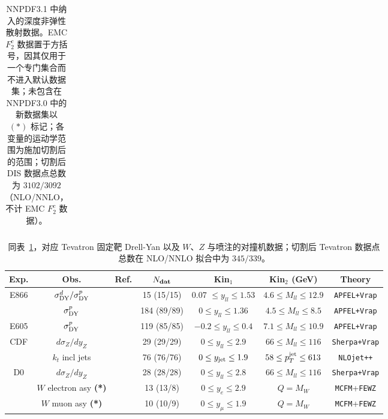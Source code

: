 \begin{table}
\begin{centering}
\begin{tabular}{|c|c|c|c|c|c|c|}
 \tabularnewline
  \hline
\end{tabular}
\par\end{centering}
\caption{\small NNPDF3.1 中纳入的深度非弹性散射数据。EMC $F_2^c$ 数据置于方括号，因其仅用于一个专门集合而不进入默认数据集；未包含在 NNPDF3.0 中的新数据集以 $(*)$ 标记；各变量的运动学范围为施加切割后的范围；切割后 DIS 数据点总数为 $3102/3092$（NLO/NNLO，不计 EMC $F_2^c$ 数据）。
\label{tab:completedataset}}
\end{table}\begin{table}
\footnotesize
\begin{centering}
    \renewcommand{\arraystretch}{1.4}
\begin{tabular}{|c|c|c|c|c|c|c|}
\hline
{Exp.} & Obs. & {Ref.}  & $ N_{\rm \bf dat}$ & Kin$_1$  & Kin$_2$ (GeV) & Theory \tabularnewline
\hline
\hline
\multirow{2}{*}{E866} &   $\sigma_{\rm DY}^d/\sigma_{\rm DY}^p$ & \cite{Towell:2001nh} & 15 (15/15)
& 0.07 $\le y_{ll}\le 1.53$ &
$ 4.6 \le M_{ll}\le 12.9 $  & {\tt APFEL+Vrap}\tabularnewline
&  $\sigma_{\rm DY}^p$ & \cite{Webb:2003ps,Webb:2003bj} & 184 (89/89) & $0 \le y_{ll}\le 1.36 $ &
$  4.5 \le M_{ll}\le 8.5 $  &{\tt APFEL+Vrap} \tabularnewline
 \hline
 E605 & $\sigma_{\rm DY}^p$ &  \cite{Moreno:1990sf} & 119 (85/85) & $ -0.2 \le y_{ll}\le 0.4$ &
 $ 7.1 \le M_{ll}\le 10.9 $  & {\tt APFEL+Vrap} \tabularnewline
 \hline
\multirow{2}{*}{CDF} &   $d\sigma_Z/dy_Z$ & \cite{Aaltonen:2010zza}&  29 (29/29)  & $ 0 \le y_{ll}\le 2.9 $  & $66 \le M_{ll}\le 116$   &{\tt Sherpa+Vrap} \tabularnewline
&  $k_t$ incl jets & \cite{Abulencia:2007ez} & 76 (76/76) & $ 0\le y_{\rm jet}\le 1.9$  &
 $ 58 \le p_T^{\rm jet}\le 613$  &{\tt NLOjet++} \tabularnewline
\hline
\multirow{3}{*}{D0}   &   $d\sigma_Z/dy_Z$ &  \cite{Abazov:2007jy}  & 28 (28/28) & $0 \le y_{ll}\le 2.8 $ &
 $66 \le M_{ll}\le 116$ & {\tt Sherpa+Vrap}\tabularnewline
&   $W$ electron asy {\bf (*)}  & \cite{D0:2014kma}  & 13  (13/8) &  $0 \le y_{e}\le 2.9 $& $Q=M_W$  &{\tt MCFM}+{\tt FEWZ}\tabularnewline
 &   $W$ muon asy {\bf (*)}  & \cite{Abazov:2013rja}  &  10 (10/9)   & $0 \le y_{\mu}\le 1.9 $ & $Q=M_W$ & {\tt MCFM}+{\tt FEWZ}\tabularnewline
  \hline
\end{tabular}
\par\end{centering}
\caption{\small 同表~\ref{tab:completedataset}，对应 Tevatron 固定靶 Drell-Yan 以及 $W$、$Z$ 与喷注的对撞机数据；切割后 Tevatron 数据点总数在 NLO/NNLO 拟合中为 $345/339$。
\label{tab:completedataset2}}
\end{table}\begin{table}[ht]

\end{table}
